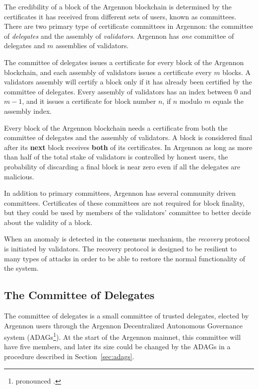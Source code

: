 
The credibility of a block of the Argennon blockchain is determined by the certificates it has received
from different sets of users, known as committees. There are two primary type of certificate committees in
Argennon: the committee of \emph{delegates} and the assembly of \emph{validators}. Argennon has \emph{one} committee
of delegates and $m$ assemblies of validators.

The committee of delegates issues a certificate for every block of the Argennon blockchain, and each
assembly of validators issues a certificate every $m$ blocks. A validators assembly will
certify a block only if it has already been certified by the committee of delegates. Every assembly of validators has
an index between $0$ and $m - 1$, and it issues a certificate for block number $n$, if $n$ modulo $m$ equals
the assembly index.

Every block of the Argennon blockchain needs a certificate from both the committee of delegates and
the assembly of validators. A block is considered final after its \textbf{next} block receives \textbf{both} of
its certificates. In Argennon as long as more than half of the total stake of validators is controlled by honest users,
the probability of discarding a final block is near zero even if all the delegates are malicious.

In addition to primary committees, Argennon has several community driven committees. Certificates of these
committees are not required for block finality, but they could be used by members of the
validators' committee to better decide about the validity of a block.

When an anomaly is detected in the consensus mechanism, the \emph{recovery} protocol is initiated by validators. The
recovery protocol is designed to be resilient to many types of attacks in order to be able to restore the normal
functionality of the system.

\subsection{The Committee of Delegates}\label{subsec:the-committee-of-delegates}

The committee of delegates is a small committee of trusted delegates, elected by Argennon users through the
Argennon Decentralized Autonomous Governance system (ADAGs\footnote{pronounced .}).
At the start of the Argennon mainnet, this committee will have
five members, and later its size could be changed by the ADAGs in a procedure described
in Section~\ref{sec:adags}.

